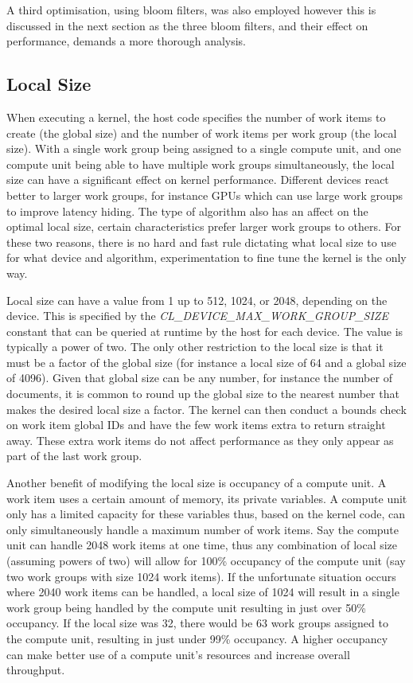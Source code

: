 A third optimisation, using bloom filters, was also employed however this is
discussed in the next section as the three bloom filters, and their effect on
performance, demands a more thorough analysis.

\subsection{Local Size}
\label{sec:localSize}

When executing a kernel, the host code specifies the number of work items to
create (the global size) and the number of work items per work group (the local
size). With a single work group being assigned to a single compute unit, and one
compute unit being able to have multiple work groups simultaneously, the local
size can have a significant effect on kernel performance. Different devices
react better to larger work groups, for instance GPUs which can use large work
groups to improve latency hiding. The type of algorithm also has an affect on
the optimal local size, certain characteristics prefer larger work groups to
others. For these two reasons, there is no hard and fast rule dictating what
local size to use for what device and algorithm, experimentation to fine tune
the kernel is the only way.

Local size can have a value from 1 up to 512, 1024, or 2048, depending on the
device. This is specified by the \emph{CL\_DEVICE\_MAX\_WORK\_GROUP\_SIZE}
constant that can be queried at runtime by the host for each device. The value
is typically a power of two. The only other restriction to the local size is
that it must be a factor of the global size (for instance a local size of 64 and
a global size of 4096). Given that global size can be any number, for instance
the number of documents, it is common to round up the global size to the nearest
number that makes the desired local size a factor. The kernel can then conduct a
bounds check on work item global IDs and have the few work items extra to return
straight away. These extra work items do not affect performance as they only
appear as part of the last work group.

Another benefit of modifying the local size is occupancy of a compute unit. A
work item uses a certain amount of memory, its private variables. A compute unit
only has a limited capacity for these variables thus, based on the kernel code,
can only simultaneously handle a maximum number of work items. Say the compute
unit can handle 2048 work items at one time, thus any combination of local size
(assuming powers of two) will allow for 100\% occupancy of the compute unit (say
two work groups with size 1024 work items). If the unfortunate situation occurs
where 2040 work items can be handled, a local size of 1024 will result in a
single work group being handled by the compute unit resulting in just over 50\%
occupancy. If the local size was 32, there would be 63 work groups assigned to
the compute unit, resulting in just under 99\% occupancy. A higher occupancy can
make better use of a compute unit's resources and increase overall throughput.

